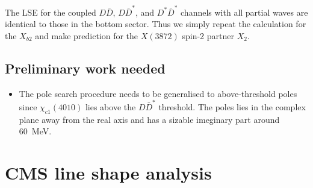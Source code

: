 \documentclass[aps,prl,showpacs,amsmath,onecolumn,superscriptaddress,floatfix,nofootinbib,notitlepage]{revtex4-2}
\newcommand{\X}{X(3872)}
\begin{document}
The LSE for the coupled $D\bar{D}$, $D\bar{D}^*$, and $D^*\bar{D}^*$ channels with all partial waves are identical to those in the bottom sector. Thus we simply repeat the calculation for the $X_{b2}$ and make prediction for the $\X$ spin-2 partner $X_2$.

\subsection{Preliminary work needed}
\begin{itemize}
	\item The pole search procedure needs to be generalised to above-threshold poles since $\chi_{c1}(4010)$ lies above the $D\bar{D}^*$ threshold. The poles lies in the complex plane away from the real axis and has a sizable imeginary part around 60~MeV.
\end{itemize}

\section{CMS line shape analysis}
\end{document}
